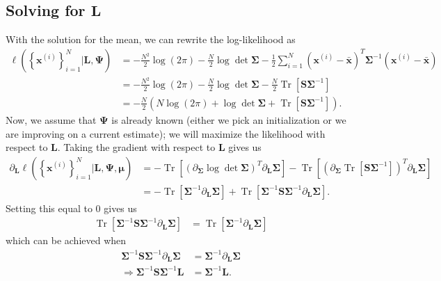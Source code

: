 \documentclass[12pt]{article}
\DeclareMathOperator{\Tr}{Tr}
\begin{document}
\subsection{Solving for $\mathbf{L}$}
With the solution for the mean, we can rewrite the log-likelihood as 
\begin{align}
	\ell \left(\left\{\mathbf{x}^{(i)}\right\}_{i=1}^N|\mathbf{L}, \boldsymbol{\Psi}\right) &= -\frac{N^2}{2} \log(2\pi) - \frac{N}{2} \log\det \boldsymbol{\Sigma} -\frac{1}{2} \sum_{i=1}^N(\mathbf{x}^{(i)} - \bar{\mathbf{x}})^T \boldsymbol{\Sigma}^{-1}\left(\mathbf{x}^{(i)} - \bar{\mathbf{x}}\right) \\
	&= -\frac{N^2}{2} \log(2\pi)- \frac{N}{2} \log\det \boldsymbol{\Sigma} -\frac{N}{2}\Tr\left[\mathbf{S} \boldsymbol{\Sigma}^{-1}\right] \\
	&= -\frac{N}{2} \left(N \log(2\pi) + \log\det \boldsymbol{\Sigma} + \Tr\left[\mathbf{S}\boldsymbol{\Sigma}^{-1}\right] \right).
\end{align}
Now, we assume that $\boldsymbol{\Psi}$ is already known (either we pick an initialization or we are improving on a current estimate); we will maximize the likelihood with respect to $\mathbf{L}$. Taking the gradient with respect to $\mathbf{L}$ gives us
\begin{align}
\partial_{\mathbf{L}} \ell \left(\left\{\mathbf{x}^{(i)}\right\}_{i=1}^N|\mathbf{L}, \boldsymbol{\Psi}, \boldsymbol{\mu}\right) &= -\Tr \left[\left(\partial_{\boldsymbol{\Sigma}} \log\det\boldsymbol{\Sigma}\right)^T \partial_{\mathbf{L}} \boldsymbol{\Sigma}\right] -\Tr \left[ \left(\partial_{\boldsymbol{\Sigma}} \Tr\left[\mathbf{S}\boldsymbol{\Sigma}^{-1}\right]\right)^T \partial_{\mathbf{L}} \boldsymbol{\Sigma}\right] \\
&= -\Tr\left[\boldsymbol{\Sigma}^{-1} \partial_{\mathbf{L}}\boldsymbol{\Sigma}\right] + \Tr \left[\boldsymbol{\Sigma}^{-1}\mathbf{S} \boldsymbol{\Sigma}^{-1} \partial_{\mathbf{L}} \boldsymbol{\Sigma}\right].
\end{align}
Setting this equal to 0 gives us 
\begin{align}
\Tr \left[\boldsymbol{\Sigma}^{-1}\mathbf{S} \boldsymbol{\Sigma}^{-1} \partial_{\mathbf{L}} \boldsymbol{\Sigma}\right] &= \Tr\left[\boldsymbol{\Sigma}^{-1} \partial_{\mathbf{L}}\boldsymbol{\Sigma}\right]
\end{align}
which can be achieved when 
\begin{align}
\boldsymbol{\Sigma}^{-1}\mathbf{S} \boldsymbol{\Sigma}^{-1} \partial_{\mathbf{L}}\boldsymbol{\Sigma} &= \boldsymbol{\Sigma}^{-1} \partial_{\mathbf{L}}\boldsymbol{\Sigma} \\
\Rightarrow \boldsymbol{\Sigma}^{-1} \mathbf{S} \boldsymbol{\Sigma}^{-1} \mathbf{L} &= \boldsymbol{\Sigma}^{-1} \mathbf{L}. 
\end{align}
\end{document}
